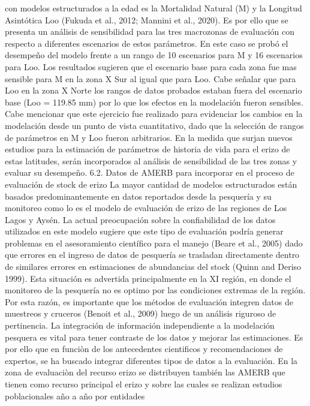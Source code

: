 \documentclass[
]{article}
\begin{document}
con modelos estructurados a la edad es la Mortalidad Natural (M) y la
Longitud Asintótica Loo (Fukuda et al., 2012; Mannini et al., 2020). Es
por ello que se presenta un análisis de sensibilidad para las tres
macrozonas de evaluación con respecto a diferentes escenarios de estos
parámetros. En este caso se probó el desempeño del modelo frente a un
rango de 10 escenarios para M y 16 escenarios para Loo. Los resultados
sugieren que el escenario base para cada zona fue mas sensible para M en
la zona X Sur al igual que para Loo. Cabe señalar que para Loo en la
zona X Norte los rangos de datos probados estaban fuera del escenario
base (Loo = 119.85 mm) por lo que los efectos en la modelación fueron
sensibles. Cabe mencionar que este ejercicio fue realizado para
evidenciar los cambios en la modelación desde un punto de vista
cuantitativo, dado que la selección de rangos de parámetros en M y Loo
fueron arbitrarios. En la medida que surjan nuevos estudios para la
estimación de parámetros de historia de vida para el erizo de estas
latitudes, serán incorporados al análisis de sensibilidad de las tres
zonas y evaluar su desempeño. 6.2. Datos de AMERB para incorporar en el
proceso de evaluación de stock de erizo La mayor cantidad de modelos
estructurados están basados predominantemente en datos reportados desde
la pesquería y su monitoreo como lo es el modelo de evaluación de erizo
de las regiones de Los Lagos y Aysén. La actual preocupación sobre la
confiabilidad de los datos utilizados en este modelo sugiere que este
tipo de evaluación podría generar problemas en el asesoramiento
científico para el manejo (Beare et al., 2005) dado que errores en el
ingreso de datos de pesquería se trasladan directamente dentro de
similares errores en estimaciones de abundancias del stock (Quinn and
Deriso 1999). Esta situación es advertida principalmente en la XI
región, en donde el monitoreo de la pesquería no es optimo por las
condiciones extremas de la región. Por esta razón, es importante que los
métodos de evaluación integren datos de muestreos y cruceros (Benoit et
al., 2009) luego de un análisis riguroso de pertinencia. La integración
de información independiente a la modelación pesquera es vital para
tener contraste de los datos y mejorar las estimaciones. Es por ello que
en funciòn de los antecedentes cientificos y recomendaciones de
expertos, se ha buscado integrar diferentes tipos de datos a la
evaluación. En la zona de evaluaciòn del recurso erizo se distribuyen
también las AMERB que tienen como recurso principal el erizo y sobre las
cuales se realizan estudios poblacionales año a año por entidades
\end{document}
